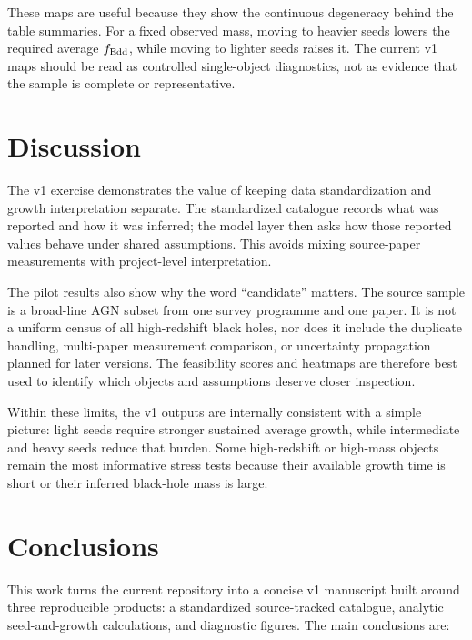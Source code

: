 \documentclass[letterpaper,12pt]{article}
\begin{document}
These maps are useful because they show the continuous degeneracy behind the table summaries. For a fixed observed mass, moving to heavier seeds lowers the required average $f_{\rm Edd}$, while moving to lighter seeds raises it. The current v1 maps should be read as controlled single-object diagnostics, not as evidence that the sample is complete or representative.

\section{Discussion}

The v1 exercise demonstrates the value of keeping data standardization and growth interpretation separate. The standardized catalogue records what was reported and how it was inferred; the model layer then asks how those reported values behave under shared assumptions. This avoids mixing source-paper measurements with project-level interpretation.

The pilot results also show why the word ``candidate'' matters. The source sample is a broad-line AGN subset from one survey programme and one paper. It is not a uniform census of all high-redshift black holes, nor does it include the duplicate handling, multi-paper measurement comparison, or uncertainty propagation planned for later versions. The feasibility scores and heatmaps are therefore best used to identify which objects and assumptions deserve closer inspection.

Within these limits, the v1 outputs are internally consistent with a simple picture: light seeds require stronger sustained average growth, while intermediate and heavy seeds reduce that burden. Some high-redshift or high-mass objects remain the most informative stress tests because their available growth time is short or their inferred black-hole mass is large.

\section{Conclusions}

This work turns the current repository into a concise v1 manuscript built around three reproducible products: a standardized source-tracked catalogue, analytic seed-and-growth calculations, and diagnostic figures. The main conclusions are:
\end{document}
